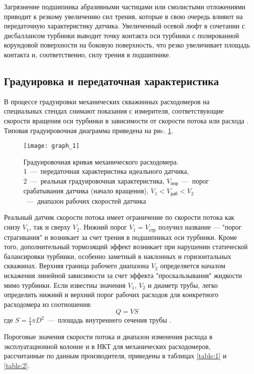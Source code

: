 Загрязнение подшипника абразивными частицами или
смолистыми отложениями приводит к резкому увеличению сил трения,
которые в свою очередь влияют на передаточную характеристику
датчика. Увеличенный осевой люфт в сочетании с дисбаллансом
турбинки выводит точку контакта оси турбинки с полированной
корундовой поверхности на боковую поверхность, что резко увеличивает
площадь контакта и, соответственно, силу трения в подшипнике.


\subsection{Градуировка и передаточная характеристика}

В процессе градуировки механических скважинных
расходомеров на специальных стендах снимают показания с измерителя,
соответствующие скорости вращения оси турбинки в зависимости от
скорости потока или расхода \cite{thermodyn}. Типовая градуировочная диаграмма
приведена на риc. \ref{fig:graph_1}.

\begin{figure}[h]
\centering
\texttt{[image: graph\_1]}
\caption{
Градуировочная кривая механического расходомера. \\
1~---~передаточная характеристика идеального датчика,
2~---~реальная градуировочная характеристика,
$V_\mathrm{пор}$~---~порог срабатывания датчика (начало вращения),
$V_1 < V_\mathrm{раб} < V_2$~---~диапазон рабочих скоростей датчика
}
\label{fig:graph_1}
\end{figure}

Реальный датчик скорости потока имеет ограничение по скорости
потока как снизу $V_1$, так и сверху $V_2$. Нижний порог $V_1 = V_\mathrm{стр}$ получил
название --- "порог страгивания" и возникает за счет трения в
подшипниках оси турбинки. Кроме того, дополнительный тормозящий
эффект возникает при нарушении статической балансировки турбинки,
особенно заметный в наклонных и горизонтальных скважинах. Верхняя
граница рабочего диапазона $V_2$ определяется началом искажения
линейной зависимости за счет эффекта "проскальзывания" жидкости
мимо турбинки. Если известны значения $V_1$, $V_2$ и диаметр трубы,
легко определить нижний и верхний порог рабочих расходов для
конкретного расходомера из соотношения:
$$Q = VS$$
где $S = \frac 1 4 \pi D^2$~---~площадь внутреннего сечения трубы \cite{thermodyn}.

Пороговые значения скорости потока и диапазон изменения расхода
в эксплуатационной колонне и в НКТ для механических расходомеров,
рассчитанные по данным производителя, приведены в таблицах \ref{table:1} и \ref{table:2}.

